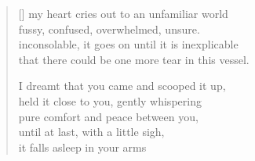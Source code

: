 
\settowidth{}
\begin{verse}[\versewidth]
my heart cries out to an unfamiliar world \\
fussy, confused, overwhelmed, unsure. \\
inconsolable, it goes on until it is inexplicable \\
that there could be one more tear in this vessel.

I dreamt that you came and scooped it up, \\
held it close to you, gently whispering \\
pure comfort and peace between you, \\
until at last, with a little sigh, \\
it falls asleep in your arms
\end{verse}
